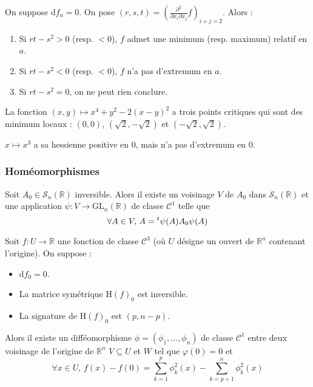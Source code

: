   \begin{example}
    On suppose $\mathrm{d}f_a = 0$. On pose $(r,s,t) = \left(  \frac{\partial^2}{\partial x_i \partial x_j} f \right)_{i+j=2}$. Alors :
    \begin{enumerate}[label=(\roman*)]
      \item Si $rt-s^2 > 0$ (resp. $< 0$), $f$ admet une minimum (resp. maximum) relatif en $a$.
      \item Si $rt-s^2 < 0$ (resp. $< 0$), $f$ n'a pas d'extremum en $a$.
      \item Si $rt-s^2 = 0$, on ne peut rien conclure.
    \end{enumerate}
  \end{example}

  \begin{example}
    La fonction $(x,y) \mapsto x^4 + y^2 - 2(x-y)^2$ a trois points critiques qui sont des minimum locaux : $(0,0)$, $(\sqrt{2},-\sqrt{2})$ et $(-\sqrt{2},\sqrt{2})$.
  \end{example}

  \begin{cexample}
    $x \mapsto x^3$ a sa hessienne positive en $0$, mais n'a pas d'extremum en $0$.
  \end{cexample}

  \subsubsection{Homéomorphismes}


  \begin{lemma}
    Soit $A_0 \in \mathcal{S}_n(\mathbb{R})$ inversible. Alors il existe un voisinage $V$ de $A_0$ dans $\mathcal{S}_n(\mathbb{R})$ et une application $\psi : V \rightarrow \mathrm{GL}_n(\mathbb{R})$ de classe $\mathcal{C}^1$ telle que
    \[ \forall A \in V, \, A = \mathstrut ^t \psi(A) A_0 \psi(A) \]
  \end{lemma}


  \begin{lemma}[Morse]
    Soit $f : U \rightarrow \mathbb{R}$ une fonction de classe $\mathcal{C}^3$ (où $U$ désigne un ouvert de $\mathbb{R}^n$ contenant l'origine). On suppose :
    \begin{itemize}
      \item $\mathrm{d} f_0 = 0$.
      \item La matrice symétrique $\mathrm{H} (f)_0$ est inversible.
      \item La signature de $\mathrm{H}(f)_0$ est $(p, n-p)$.
    \end{itemize}
    Alors il existe un difféomorphisme $\phi = (\phi_1, \dots, \phi_n)$ de classe $\mathcal{C}^1$ entre deux voisinage de l'origine de $\mathbb{R}^n$ $V \subseteq U$ et $W$ tel que $\varphi(0) = 0$ et
    \[ \forall x \in U, \, f(x) - f(0) = \sum_{k=1}^p \phi_k^2(x) - \sum_{k=p+1}^n \phi_k^2(x) \]
  \end{lemma}

